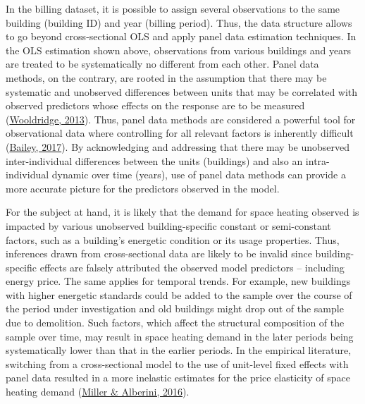 \documentclass[12pt,twoside]{reedthesis}
\begin{document}
In the billing dataset, it is possible to assign several observations to the same building (building ID) and year (billing period). Thus, the data structure allows to go beyond cross-sectional OLS and apply panel data estimation techniques. In the OLS estimation shown above, observations from various buildings and years are treated to be systematically no different from each other. Panel data methods, on the contrary, are rooted in the assumption that there may be systematic and unobserved differences between units that may be correlated with observed predictors whose effects on the response are to be measured (\protect\hyperlink{ref-wooldridge13}{Wooldridge, 2013}). Thus, panel data methods are considered a powerful tool for observational data where controlling for all relevant factors is inherently difficult (\protect\hyperlink{ref-bailey17}{Bailey, 2017}). By acknowledging and addressing that there may be unobserved inter-individual differences between the units (buildings) and also an intra-individual dynamic over time (years), use of panel data methods can provide a more accurate picture for the predictors observed in the model.

For the subject at hand, it is likely that the demand for space heating observed is impacted by various unobserved building-specific constant or semi-constant factors, such as a building's energetic condition or its usage properties. Thus, inferences drawn from cross-sectional data are likely to be invalid since building-specific effects are falsely attributed the observed model predictors -- including energy price. The same applies for temporal trends. For example, new buildings with higher energetic standards could be added to the sample over the course of the period under investigation and old buildings might drop out of the sample due to demolition. Such factors, which affect the structural composition of the sample over time, may result in space heating demand in the later periods being systematically lower than that in the earlier periods. In the empirical literature, switching from a cross-sectional model to the use of unit-level fixed effects with panel data resulted in a more inelastic estimates for the price elasticity of space heating demand (\protect\hyperlink{ref-miller_alberini16}{Miller \& Alberini, 2016}).
\end{document}
